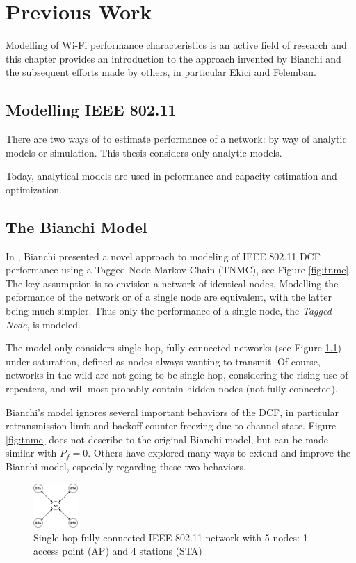 
\chapter{Previous Work}

Modelling of Wi-Fi performance characteristics is an active field of research
and this chapter provides an introduction to the approach invented by Bianchi
and the subsequent efforts made by others, in particular Ekici and Felemban.

\section{Modelling IEEE 802.11}

There are two ways of to estimate performance of a network: by way of analytic
models or simulation. This thesis considers only analytic models.

Today, analytical models are used in peformance and capacity estimation and
optimization.

\section{The Bianchi Model}

In \cite{bianchi}, Bianchi presented a novel approach to modeling of IEEE
802.11 DCF performance using a Tagged-Node Markov Chain (TNMC), see Figure
\ref{fig:tnmc}. The key assumption is to envision a network of identical
nodes. Modelling the peformance of the network or of a single node are
equivalent, with the latter being much simpler. Thus only the performance of a
single node, the \emph{Tagged Node}, is modeled. 

The model only considers single-hop, fully connected networks (see Figure
\ref{fig:shfc}) under saturation, defined as nodes always wanting to transmit.
Of course, networks in the wild are not going to be single-hop, considering
the rising use of repeaters, and will most probably contain hidden nodes (not
fully connected).

Bianchi's model ignores several important behaviors of the DCF, in particular
retransmission limit and backoff counter freezing due to channel state. Figure
\ref{fig:tnmc} does not describe to the original Bianchi model, but can be
made similar with $P_f = 0$. Others have explored many ways to extend and
improve the Bianchi model, especially regarding these two behaviors. 

\begin{figure}
\center
\includegraphics[width=0.15\textwidth]{images/shfc-network.pdf}
\caption{Single-hop fully-connected IEEE 802.11 network with 5 nodes: 1 access point (AP) and 4 stations (STA)}
\label{fig:shfc}
\end{figure}


